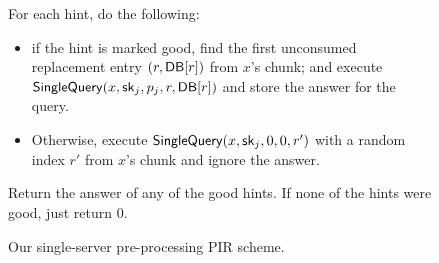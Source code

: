 \begin{figure}[p]
\begin{minipage}{\textwidth}
\begin{mdframed}
\begin{enumerate}[leftmargin=5mm,itemsep=1pt]
{                    %
                    \item For each hint, do the following:
            \begin{itemize}
                \item if the hint is marked good, find the first unconsumed replacement entry $(r, \mathsf{DB}[r])$ from $x$'s chunk;
                and execute $\mathsf{SingleQuery}(x, \mathsf{sk}_j, p_j,r,\mathsf{DB}[r])$ and store the answer for the query.
                \item Otherwise, execute $\mathsf{SingleQuery}(x, \mathsf{sk}_j, 0,0,r')$ with a random index $r'$ from $x$'s chunk  and ignore the answer.
            \end{itemize}
                
            \item Return the answer of any of the good hints. If none of the hints were good, just return $0$.
}
                    
                
            \end{enumerate}
        \end{mdframed}
    \end{minipage}
    \caption{
Our single-server pre-processing PIR scheme.
}
    \label{fig:1server-new}
\end{figure}


